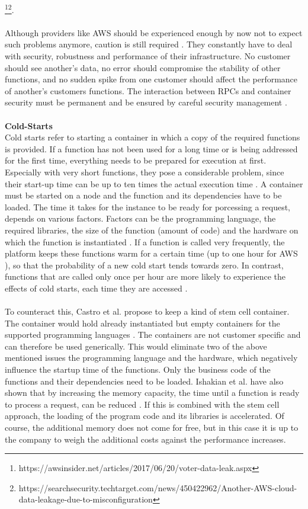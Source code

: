 \documentclass[a4paper,twoside,11pt, pagesize]{scrartcl}
\begin{document}
\footnote{https://awsinsider.net/articles/2017/06/20/voter-data-leak.aspx}\footnote{https://searchsecurity.techtarget.com/news/450422962/Another-AWS-cloud-data-leakage-due-to-misconfiguration}.\\\\ Although providers like AWS should be experienced enough by now not to expect such problems anymore, caution is still required \cite{fowler2018serverless}. They constantly have to deal with security, robustness and performance of their infrastructure. No customer should see another's data, no error should compromise the stability of other functions, and no sudden spike from one customer should affect the performance of another's customers functions. The interaction between RPCs and container security must be permanent and be ensured by careful security management \cite{mcgrath2017serverless}.\\\\ \textbf{Cold-Starts}\\ Cold starts refer to starting a container in which a copy of the required functions is provided. If a function has not been used for a long time or is being addressed for the first time, everything needs to be prepared for execution at first. Especially with very short functions, they pose a considerable problem, since their start-up time can be up to ten times the actual execution time \cite{shahrad2019architectural}. A container must be started on a node and the function and its dependencies have to be loaded. The time it takes for the instance to be ready for porcessing a request, depends on various factors. Factors can be the programming language, the required libraries, the size of the function (amount of code) and the hardware on which the function is instantiated \cite{shafiei2020serverless} \cite{jonas2019cloud}. If a function is called very frequently, the platform keeps these functions \glqq warm\grqq{} for a certain time (up to one hour for AWS \cite{roberts2017serverless}), so that the probability of a new cold start tends towards zero. In contrast, functions that are called only once per hour are more likely to experience the effects of cold starts, each time they are accessed \cite{roberts2017serverless}.\\\\ To counteract this, Castro et al. propose to keep a kind of stem cell container. The container would hold already instantiated but empty containers for the supported programming languages \cite{castro2019server}. The containers are not customer specific and can therefore be used generically. This would eliminate two of the above mentioned issues the programming language and the hardware, which negatively influence the startup time of the functions. Only the business code of the functions and their dependencies need to be loaded. Ishakian et al. have also shown that by increasing the memory capacity, the time until a function is ready to process a request, can be reduced \cite{ishakian2018serving}. If this is combined with the stem cell approach, the loading of the program code and its libraries is accelerated. Of course, the additional memory does not come for free, but in this case it is up to the company to weigh the additional costs against the performance increases.
\end{document}
